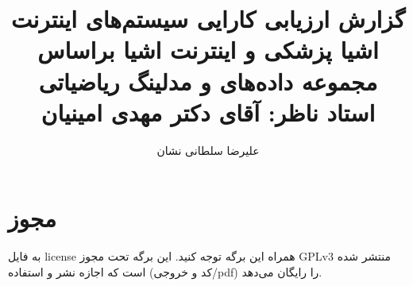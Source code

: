 \documentclass[a4paper]{article}
\title{گزارش ارزیابی کارایی سیستم‌های اینترنت اشیا پزشکی و اینترنت اشیا براساس
مجموعه داده‌های \lr{CICIoMT2024} و مدلینگ ریاضیاتی \\ استاد ناظر: آقای دکتر مهدی
امینیان}
\author{علیرضا سلطانی نشان}
\begin{document}
\maketitle

\section*{مجوز}

به فایل license همراه این برگه توجه کنید. این برگه تحت مجوز GPLv3 منتشر شده است
که اجازه نشر و استفاده (کد و خروجی/pdf) را رایگان می‌دهد.

\tableofcontents
\listoffigures
\listoftables




\newpage


\end{document}
